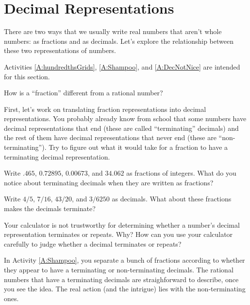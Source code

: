 \section{Decimal Representations}

There are two ways that we usually write real numbers that aren't whole numbers:  as fractions and as decimals.  Let's explore the relationship between these two representations of numbers.  

\begin{activitynote}
Activities \ref{A:hundredthsGrids}, \ref{A:Shampoo}, and \ref{A:DecNotNice} are intended for this section. 
\end{activitynote}

\begin{question} How is a ``fraction'' different from a rational number?  
\end{question}
\QM

First, let's work on translating fraction representations into decimal representations.  You probably already know from school that some numbers have decimal representations that end (these are called ``terminating'' decimals) and the rest of them have decimal representations that never end (these are ``non-terminating'').  Try to figure out what it would take for a fraction to have a terminating decimal representation.  

\begin{question}
Write $.465$, $0.72895$, $0.00673$, and $34.062$ as fractions of integers.  What do you notice about terminating decimals when they are written as fractions?  
\end{question}
\QM

\begin{question}
Write $4/5$, $7/16$, $43/20$, and $3/6250$ as decimals.   What about these fractions makes the decimals terminate?
\end{question}
\QM

\begin{question}
Your calculator is not trustworthy for determining whether a number's decimal representation terminates or repeats.  Why?  How can you use your calculator carefully to judge whether a decimal terminates or repeats?  
\end{question}
\QM

In Activity \ref{A:Shampoo}, you separate a bunch of fractions according to whether they appear to have a terminating or non-terminating decimals.  The rational numbers that have a terminating decimals are straighforward to describe, once you see the idea.  The real action (and the intrigue) lies with the non-terminating ones.  


